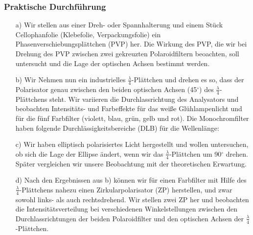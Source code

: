 \documentclass[12pt]{scrartcl}
\begin{document}
\subsubsection{Praktische Durchführung}
\begin{enumerate}
\item[a)]
Wir stellen aus einer Dreh- oder Spannhalterung und einem Stück Cellophanfolie (Klebefolie, Verpackungsfolie) ein Phasenverschiebungsplättchen (PVP) her. %
Die Wirkung des PVP, die wir bei Drehung des PVP zwischen zwei gekreuzten Polaroidfiltern beoachten, soll untersucht und die Lage der optischen Achsen bestimmt werden.
\item[b)] Wir Nehmen nun ein industrielles
$\frac{\lambda}{4}$-Plättchen und drehen es so, dass der Polarisator genau zwischen den beiden optischen Achsen (45$^\circ$) des $\frac{\lambda}{4}$-Plättchens steht.
Wir variieren die Durchlassrichtung des Analysators und beobachten Intensitäts- und Farbeffekte für das weiße Glühlampenlicht und für die fünf
Farbfilter (violett, blau, grün, gelb und rot). Die Monochromfilter 
haben folgende Durchlässigkeitsbereiche (DLB) für die Wellenlänge:

\item[c)] Wir haben elliptisch polarisiertes Licht hergestellt und wollen untersuchen, ob sich die Lage der Ellipse ändert, wenn wir das $\frac{\lambda}{4}$-Plättchen um 90$^\circ$
drehen. Später vergleichen wir unsere Beobachtung mit der theoretischen Erwartung.
\item[d)] Nach den Ergebnissen aus b) können wir für einen Farbfilter mit Hilfe des $\frac{\lambda}{4}$-Plättchens nahezu einen Zirkularpolarisator (ZP) herstellen, und zwar sowohl links- als auch rechtsdrehend. Wir stellen zwei ZP her und beobachten die Intensitätsverteilung bei verschiedenen Winkelstellungen zwischen den Durchlassrichtungen der beiden Polaroidfilter und den optischen Achsen der $\frac{\lambda}{4}$-Plättchen.
\end{enumerate}
\end{document}

